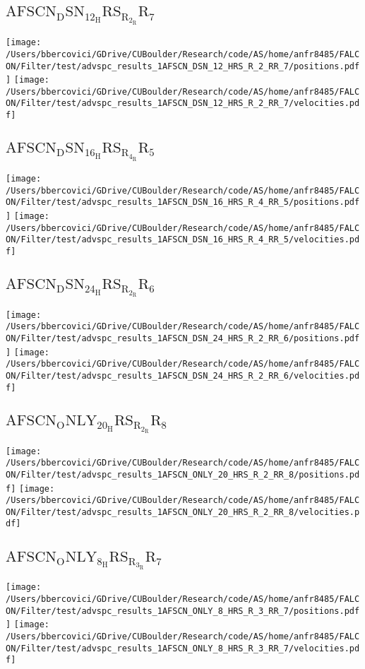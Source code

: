 \subsection{$\mathrm{AFSCN_DSN_12_HRS_R_2_RR_7}$}
\texttt{[image: /Users/bbercovici/GDrive/CUBoulder/Research/code/AS/home/anfr8485/FALCON/Filter/test/advspc\_results\_1AFSCN\_DSN\_12\_HRS\_R\_2\_RR\_7/positions.pdf]}
\texttt{[image: /Users/bbercovici/GDrive/CUBoulder/Research/code/AS/home/anfr8485/FALCON/Filter/test/advspc\_results\_1AFSCN\_DSN\_12\_HRS\_R\_2\_RR\_7/velocities.pdf]}
\subsection{$\mathrm{AFSCN_DSN_16_HRS_R_4_RR_5}$}
\texttt{[image: /Users/bbercovici/GDrive/CUBoulder/Research/code/AS/home/anfr8485/FALCON/Filter/test/advspc\_results\_1AFSCN\_DSN\_16\_HRS\_R\_4\_RR\_5/positions.pdf]}
\texttt{[image: /Users/bbercovici/GDrive/CUBoulder/Research/code/AS/home/anfr8485/FALCON/Filter/test/advspc\_results\_1AFSCN\_DSN\_16\_HRS\_R\_4\_RR\_5/velocities.pdf]}
\subsection{$\mathrm{AFSCN_DSN_24_HRS_R_2_RR_6}$}
\texttt{[image: /Users/bbercovici/GDrive/CUBoulder/Research/code/AS/home/anfr8485/FALCON/Filter/test/advspc\_results\_1AFSCN\_DSN\_24\_HRS\_R\_2\_RR\_6/positions.pdf]}
\texttt{[image: /Users/bbercovici/GDrive/CUBoulder/Research/code/AS/home/anfr8485/FALCON/Filter/test/advspc\_results\_1AFSCN\_DSN\_24\_HRS\_R\_2\_RR\_6/velocities.pdf]}
\subsection{$\mathrm{AFSCN_ONLY_20_HRS_R_2_RR_8}$}
\texttt{[image: /Users/bbercovici/GDrive/CUBoulder/Research/code/AS/home/anfr8485/FALCON/Filter/test/advspc\_results\_1AFSCN\_ONLY\_20\_HRS\_R\_2\_RR\_8/positions.pdf]}
\texttt{[image: /Users/bbercovici/GDrive/CUBoulder/Research/code/AS/home/anfr8485/FALCON/Filter/test/advspc\_results\_1AFSCN\_ONLY\_20\_HRS\_R\_2\_RR\_8/velocities.pdf]}
\subsection{$\mathrm{AFSCN_ONLY_8_HRS_R_3_RR_7}$}
\texttt{[image: /Users/bbercovici/GDrive/CUBoulder/Research/code/AS/home/anfr8485/FALCON/Filter/test/advspc\_results\_1AFSCN\_ONLY\_8\_HRS\_R\_3\_RR\_7/positions.pdf]}
\texttt{[image: /Users/bbercovici/GDrive/CUBoulder/Research/code/AS/home/anfr8485/FALCON/Filter/test/advspc\_results\_1AFSCN\_ONLY\_8\_HRS\_R\_3\_RR\_7/velocities.pdf]}

